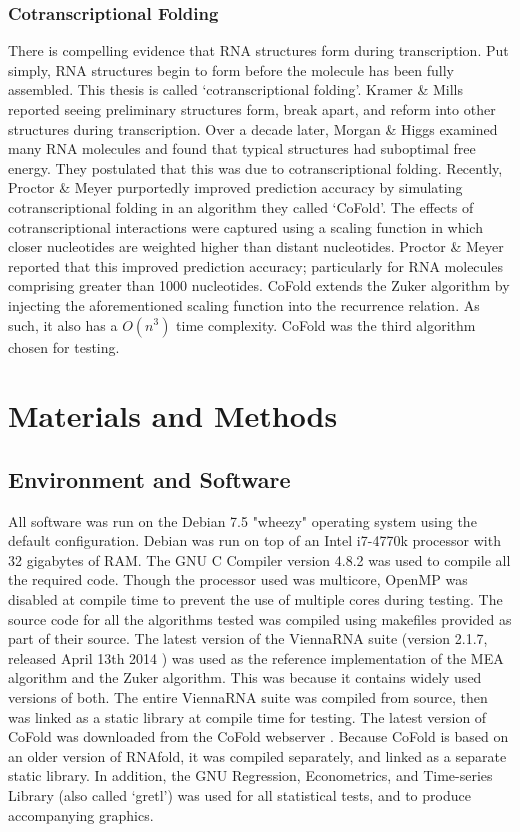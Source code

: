\documentclass[12pt, a4paper]{article}
\begin{document}
\subsubsection{Cotranscriptional Folding}
There is compelling evidence that RNA structures form during transcription. Put simply, RNA structures begin to form before the molecule has been fully assembled. This thesis is called `cotranscriptional folding'. Kramer \& Mills \cite{kramer1981secondary} reported seeing preliminary structures form, break apart, and reform into other structures during transcription. Over a decade later, Morgan \& Higgs \cite{morgan1996evidence} examined many RNA molecules and found that typical structures had suboptimal free energy. They postulated that this was due to cotranscriptional folding. Recently, Proctor \& Meyer \cite{proctor2013cofold} purportedly improved prediction accuracy by simulating cotranscriptional folding in an algorithm they called `CoFold'. The effects of cotranscriptional interactions were captured using a scaling function in which closer nucleotides are weighted higher than distant nucleotides. Proctor \& Meyer \cite{proctor2013cofold} reported that this improved prediction accuracy; particularly for RNA molecules comprising greater than 1000 nucleotides. CoFold extends the Zuker algorithm by injecting the aforementioned scaling function into the recurrence relation. As such, it also has a $O(n^3)$ time complexity. CoFold was the third algorithm chosen for testing.

\section{Materials and Methods}
\subsection{Environment and Software}
All software was run on the Debian 7.5 "wheezy" operating system using the default configuration. Debian was run on top of an Intel i7-4770k processor with 32 gigabytes of RAM. The GNU C Compiler version 4.8.2 was used to compile all the required code. Though the processor used was multicore, OpenMP was disabled at compile time to prevent the use of multiple cores during testing. The source code for all the algorithms tested was compiled using makefiles provided as part of their source. The latest version of the ViennaRNA suite \cite{lorenz2011viennarna} (version 2.1.7, released April 13th 2014 \cite{lorenz2014online}) was used as the reference implementation of the MEA algorithm and the Zuker algorithm. This was because it contains widely used versions of both. The entire ViennaRNA suite was compiled from source, then was linked as a static library at compile time for testing. The latest version of CoFold was downloaded from the CoFold webserver \cite{cofold2014online}. Because CoFold is based on an older version of RNAfold, it was compiled separately, and linked as a separate static library. In addition, the GNU Regression, Econometrics, and Time-series Library (also called `gretl') was used for all statistical tests, and to produce accompanying graphics.
\end{document}

